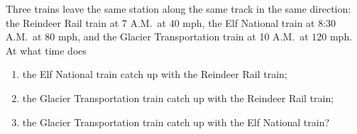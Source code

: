 Three trains leave the same station along the same track in the same direction: the Reindeer Rail train at 7 A.M.\ at $40$ mph, the Elf National train at 8:30 A.M.\ at $80$ mph, and the Glacier Transportation train at 10 A.M.\ at $120$ mph. At what time does
\begin{enumerate}
\item[(a)] the Elf National train catch up with the Reindeer Rail train;
\item[(b)] the Glacier Transportation train catch up with the Reindeer Rail train;
\item[(c)] the Glacier Transportation train catch up with the Elf National train?
\end{enumerate}
